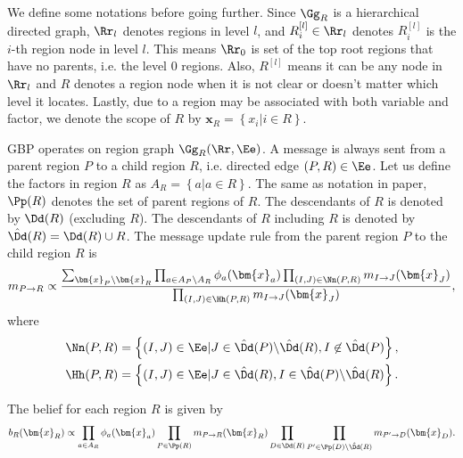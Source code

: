 We define some notations before going further. Since $\Gg_R$ is a hierarchical directed graph, $\Rr_l$ denotes regions in level $l$, and 
$R^{[l]}_i\in \Rr_l$ denotes $R^{[l]}_i$ is the $i$-th region node in level $l$. This means $\Rr_0$ is set of the top root regions that have no parents, i.e. the level $0$ regions. Also, $R^{[l]}$ means it can be any node in $\Rr_l$ and $R$ denotes a region node when it is not clear or doesn't matter which level it locates. Lastly, due to a region may be associated with both variable and factor, we denote the scope of $R$ by  $\bm{x}_R = \left\{ x_i| i \in R \right\}$.


GBP operates on region graph $\Gg_R(\Rr,\Ee)$. A message is always sent from a parent region $P$ to a child region $R$, i.e. directed edge $(P, R)\in \Ee$. Let us define the factors in region $R$ as $A_R = \left\{ a | a \in R \right\}$.
The same as notation in paper, $\Pp(R)$ denotes the set of parent regions of $R$. The descendants of $R$ is denoted by $\Dd(R)$ (excluding $R$). The descendants of $R$ including $R$ is denoted by $\hat{\Dd}(R) = \Dd(R) \cup R$. The message update rule from the parent region $P$ to the child region $R$ is
\begin{align}
  m_{P\rightarrow R} \propto \frac{\sum_{\bm{x}_P\backslash
    \bm{x}_R}\prod_{a\in A_P\backslash A_R}\phi_a(\bm{x}_a)\prod_{(I,J)
    \in \Nn(P, R)}m_{I\rightarrow J}(\bm{x}_J)}{\prod_{(I,J)
    \in \Hh(P, R)}m_{I\rightarrow J}(\bm{x}_J)},
\end{align}
where
\begin{align}
  \Nn(P, R) &= \left\{ (I,J)\in \Ee | J \in \hat{\Dd}(P) \backslash \hat{\Dd}(R), I \not\in \hat{\Dd}(P)\right\},\nonumber \\
  \Hh(P, R) &= \left\{ (I,J) \in \Ee | J \in \hat{\Dd}(R), I \in \hat{\Dd}(P) \backslash \hat{\Dd}(R) \right\}.
\end{align}

The belief for each region $R$ is given by
\begin{align}
  b_R(\bm{x}_R) \propto \prod_{a\in A_R} \phi_a(\bm{x}_a) \prod_{P\in
                       \Pp(R)} m_{P\rightarrow R}(\bm{x}_R) \prod_{D\in \Dd(R)} \prod_{P^{\prime} \in \Pp(D) \backslash \hat{\Dd}(R)} m_{P^{\prime}\rightarrow D}(\bm{x}_D).
\end{align}






